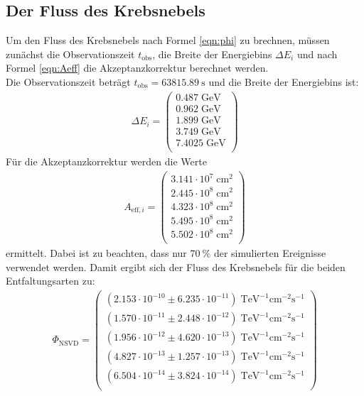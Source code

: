 \subsection{Der Fluss des Krebsnebels}
Um den Fluss des Krebsnebels nach Formel \eqref{eqn:phi} zu brechnen, müssen zunächst die Observationszeit $t_{\text{obs}}$, die Breite der Energiebins $\Delta E_{i}$ und nach Formel \eqref{eqn:Aeff} die Akzeptanzkorrektur berechnet werden.\\
Die Observationszeit beträgt $t_{\text{obs}} = \SI{63815.89}{\second}$ und die Breite der Energiebins ist:
\begin{align*}
	\Delta E_{i} = \begin{pmatrix}
			0.487\;\mathrm{GeV}\\
			0.962\;\mathrm{GeV}\\
			1.899\;\mathrm{GeV}\\
			3.749\;\mathrm{GeV}\\
			7.4025\;\mathrm{GeV}\\
	\end{pmatrix}
\end{align*}
Für die Akzeptanzkorrektur werden die Werte
\begin{align*}
	A_{\text{eff},i} = \begin{pmatrix}
			3.141\cdot10^{7}\;\mathrm{cm}^2\\
			2.445\cdot10^{8}\;\mathrm{cm}^2\\
			4.323\cdot10^{8}\;\mathrm{cm}^2\\
			5.495\cdot10^{8}\;\mathrm{cm}^2\\
			5.502\cdot10^{8}\;\mathrm{cm}^2\\
	\end{pmatrix}
\end{align*}
ermittelt. Dabei ist zu beachten, dass nur $\SI{70}{\percent}$ der simulierten Ereignisse verwendet werden.
Damit ergibt sich der Fluss des Krebsnebels für die beiden Entfaltungsarten zu:
\begin{align*}
	\Phi_{\text{NSVD}} = \begin{pmatrix}
			(2.153\cdot10^{-10}\pm 6.235\cdot10^{-11})\;\mathrm{TeV}^{-1}\mathrm{cm}^{-2}\mathrm{s}^{-1}\\
			(1.570\cdot10^{-11}\pm 2.448\cdot10^{-12})\;\mathrm{TeV}^{-1}\mathrm{cm}^{-2}\mathrm{s}^{-1}\\
			(1.956\cdot10^{-12}\pm 4.620\cdot10^{-13})\;\mathrm{TeV}^{-1}\mathrm{cm}^{-2}\mathrm{s}^{-1}\\
			(4.827\cdot10^{-13}\pm 1.257\cdot10^{-13})\;\mathrm{TeV}^{-1}\mathrm{cm}^{-2}\mathrm{s}^{-1}\\
			(6.504\cdot10^{-14}\pm 3.824\cdot10^{-14})\;\mathrm{TeV}^{-1}\mathrm{cm}^{-2}\mathrm{s}^{-1}\\
	 \end{pmatrix}
\end{align*}
